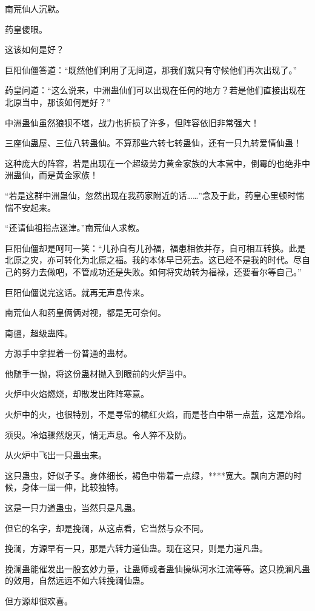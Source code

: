 \begin{this_body}
南荒仙人沉默。

药皇傻眼。

这该如何是好？

巨阳仙僵答道：“既然他们利用了无间道，那我们就只有守候他们再次出现了。”

药皇问道：“这么说来，中洲蛊仙们可以出现在任何的地方？若是他们直接出现在北原当中，那该如何是好？”

中洲蛊仙虽然狼狈不堪，战力也折损了许多，但阵容依旧非常强大！

三座仙蛊屋、三位八转蛊仙。不算那些六转七转蛊仙，还有一只九转爱情仙蛊！

这种庞大的阵容，若是出现在一个超级势力黄金家族的大本营中，倒霉的也绝非中洲蛊仙，而是黄金家族！

“若是这群中洲蛊仙，忽然出现在我药家附近的话……”念及于此，药皇心里顿时惴惴不安起来。

“还请仙祖指点迷津。”南荒仙人求教。

巨阳仙僵却是呵呵一笑：“儿孙自有儿孙福，福患相依并存，自可相互转换。此是北原之灾，亦可转化为北原之福。我的本体早已死去。这已经不是我的时代。尽自己的努力去做吧，不管成功还是失败。如何将灾劫转为福禄，还要看尔等自己。”

巨阳仙僵说完这话。就再无声息传来。

南荒仙人和药皇俩俩对视，都是无可奈何。

南疆，超级蛊阵。

方源手中拿捏着一份普通的蛊材。

他随手一抛，将这份蛊材抛入到眼前的火炉当中。

火炉中火焰燃烧，却散发出阵阵寒意。

火炉中的火，也很特别，不是寻常的橘红火焰，而是苍白中带一点蓝，这是冷焰。

须臾。冷焰骤然熄灭，悄无声息。令人猝不及防。

从火炉中飞出一只蛊虫来。

这只蛊虫，好似孑孓。身体细长，褐色中带着一点绿，****宽大。飘向方源的时候，身体一屈一伸，比较独特。

这是一只力道蛊虫，当然只是凡蛊。

但它的名字，却是挽澜，从这点看，它当然与众不同。

挽澜，方源早有一只，那是六转力道仙蛊。现在这只，则是力道凡蛊。

挽澜蛊能催发出一股玄妙力量，让蛊师或者蛊仙操纵河水江流等等。这只挽澜凡蛊的效用，自然远远不如六转挽澜仙蛊。

但方源却很欢喜。


\end{this_body}
